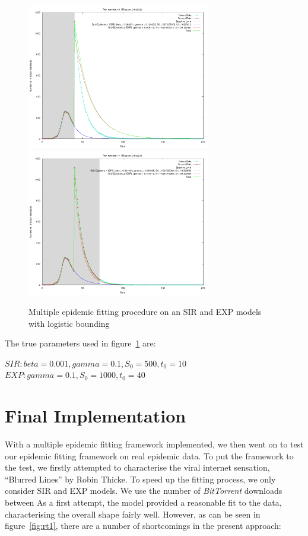 \begin{centering}
\begin{figure}[h!]
  \includegraphics[width=8cm]{images/multi/sirexp1.png}
  \includegraphics[width=8cm]{images/multi/sirexp2.png}
  \caption{Multiple epidemic fitting procedure on an SIR and EXP models with logistic bounding}
\label{fig:sirexp1}
  \end{figure}
\end{centering}

The true parameters used in figure~\ref{fig:sirexp1} are:

$SIR: beta = 0.001, gamma = 0.1, S_0 = 500, t_0 = 10$ \\
$EXP: gamma = 0.1, S_0 = 1000, t_0 = 40$


\section{Final Implementation}
With a multiple epidemic fitting framework implemented, we then went
on to test our epidemic fitting framework on real epidemic data. To
put the framework to the test, we firstly attempted to characterise
the viral internet sensation, ``Blurred Lines'' by Robin Thicke. To
speed up the fitting process, we only consider SIR and EXP models. We
use the number of \emph{BitTorrent} downloads between As
a first attempt, the model provided a reasonable fit to the data,
characterising the overall shape fairly well. However, as can be seen
in figure~\ref{fig:rt1}, there are a number of shortcomings in the
present approach:


